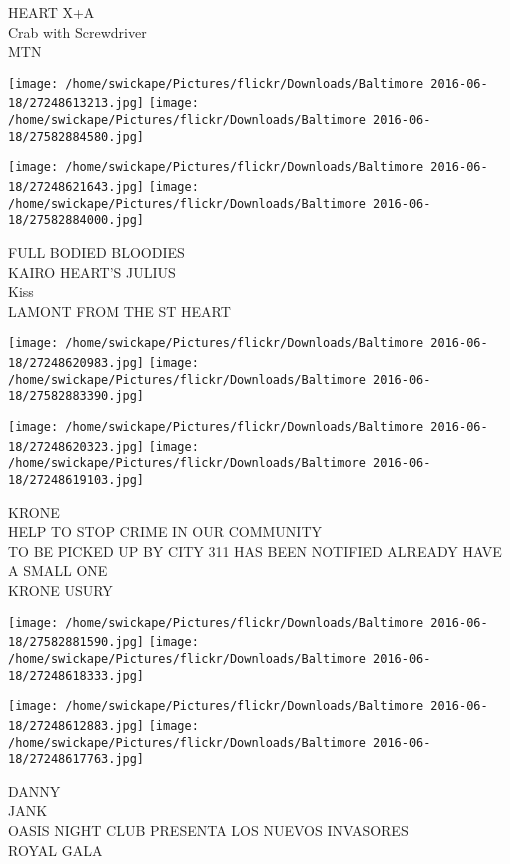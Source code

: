 \documentclass[10pt,letterpaper]{article}
\begin{document}
HEART X+A\\
Crab with Screwdriver\\
MTN\\
\pagebreak

\texttt{[image: /home/swickape/Pictures/flickr/Downloads/Baltimore 2016-06-18/27248613213.jpg]}
\texttt{[image: /home/swickape/Pictures/flickr/Downloads/Baltimore 2016-06-18/27582884580.jpg]}

\texttt{[image: /home/swickape/Pictures/flickr/Downloads/Baltimore 2016-06-18/27248621643.jpg]}
\texttt{[image: /home/swickape/Pictures/flickr/Downloads/Baltimore 2016-06-18/27582884000.jpg]}

FULL BODIED BLOODIES\\
KAIRO HEART'S JULIUS\\
Kiss\\
LAMONT FROM THE ST HEART\\
\pagebreak

\texttt{[image: /home/swickape/Pictures/flickr/Downloads/Baltimore 2016-06-18/27248620983.jpg]}
\texttt{[image: /home/swickape/Pictures/flickr/Downloads/Baltimore 2016-06-18/27582883390.jpg]}

\texttt{[image: /home/swickape/Pictures/flickr/Downloads/Baltimore 2016-06-18/27248620323.jpg]}
\texttt{[image: /home/swickape/Pictures/flickr/Downloads/Baltimore 2016-06-18/27248619103.jpg]}

KRONE\\
HELP TO STOP CRIME IN OUR COMMUNITY\\
TO BE PICKED UP BY CITY 311 HAS BEEN NOTIFIED ALREADY HAVE A SMALL ONE\\
KRONE USURY\\
\pagebreak

\texttt{[image: /home/swickape/Pictures/flickr/Downloads/Baltimore 2016-06-18/27582881590.jpg]}
\texttt{[image: /home/swickape/Pictures/flickr/Downloads/Baltimore 2016-06-18/27248618333.jpg]}

\texttt{[image: /home/swickape/Pictures/flickr/Downloads/Baltimore 2016-06-18/27248612883.jpg]}
\texttt{[image: /home/swickape/Pictures/flickr/Downloads/Baltimore 2016-06-18/27248617763.jpg]}

DANNY\\
JANK\\
OASIS NIGHT CLUB PRESENTA LOS NUEVOS INVASORES\\
ROYAL GALA\\
\pagebreak
\end{document}
